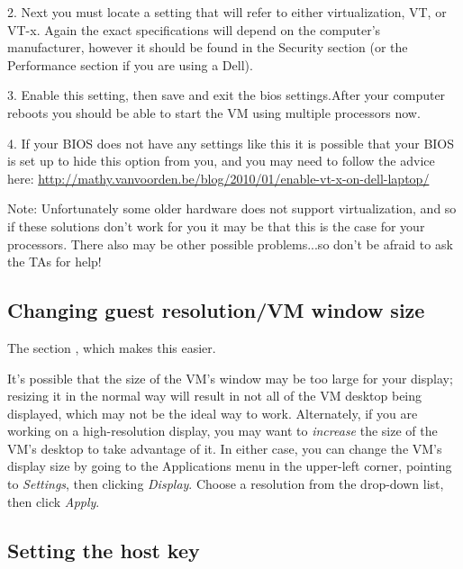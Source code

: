 \documentclass[letterpaper,10pt,english]{sphinxmanual}
\begin{document}
2. Next you must locate a setting that will refer to either virtualization, VT, or VT-x.
Again the exact specifications will depend on the computer's manufacturer, however
it should be found in the Security section (or the Performance section if you are using a Dell).

3. Enable this setting,
then save and exit the bios settings.After your computer reboots you should be able to start the VM using multiple processors now.

4. If your BIOS does not have any settings like this it is possible that your BIOS is set up to hide this option from you, and you
may need to follow the advice here: \url{http://mathy.vanvoorden.be/blog/2010/01/enable-vt-x-on-dell-laptop/}

Note: Unfortunately some older hardware does not support virtualization, and so if these solutions don't work for you it may
be that this is the case for your processors. There also may be other possible problems...so don't be afraid to ask the TAs for help!


\subsection{Changing guest resolution/VM window size}
\label{vm:changing-guest-resolution-vm-window-size}



The section {\hyperref[vm:vm\string-additions]{}}, which makes this easier.



It's possible that the size of the VM's window may be too large for
your display; resizing it in the normal way will result in not all of
the VM desktop being displayed, which may not be the ideal way to
work.  Alternately, if you are working on a high-resolution display,
you may want to \emph{increase} the size of the VM's desktop to take
advantage of it.  In either case, you can change the VM's display size
by going to the Applications menu in the upper-left corner, pointing to
\emph{Settings}, then clicking \emph{Display}.  Choose a resolution from the
drop-down list, then click \emph{Apply}.


\subsection{Setting the host key}
\label{vm:setting-the-host-key}

\end{document}
